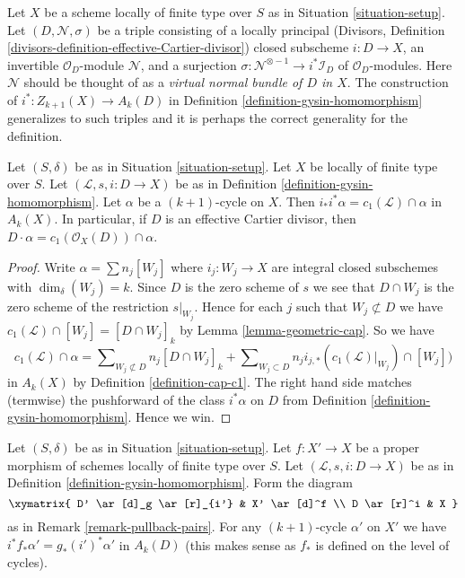 \begin{remark}
\label{remark-generalize}
Let $X$ be a scheme locally of finite type over $S$ as in
Situation \ref{situation-setup}. Let $(D, \mathcal{N}, \sigma)$
be a triple consisting of a locally principal (Divisors, Definition
\ref{divisors-definition-effective-Cartier-divisor}) closed subscheme
$i : D \to X$, an invertible $\mathcal{O}_D$-module $\mathcal{N}$, and
a surjection $\sigma : \mathcal{N}^{\otimes -1} \to i^*\mathcal{I}_D$
of $\mathcal{O}_D$-modules. Here $\mathcal{N}$ should be thought of as
a {\it virtual normal bundle of $D$ in $X$}. The construction of
$i^* : Z_{k + 1}(X) \to A_k(D)$ in
Definition \ref{definition-gysin-homomorphism}
generalizes to such triples and it is perhaps the correct generality
for the definition.
\end{remark}

\begin{lemma}
\label{lemma-support-cap-effective-Cartier}
Let $(S, \delta)$ be as in Situation \ref{situation-setup}. Let $X$ be locally
of finite type over $S$. Let $(\mathcal{L}, s, i : D \to X)$ be as in
Definition \ref{definition-gysin-homomorphism}. Let $\alpha$ be a
$(k + 1)$-cycle on $X$. Then $i_*i^*\alpha = c_1(\mathcal{L}) \cap \alpha$
in $A_k(X)$. In particular, if $D$ is an effective Cartier divisor, then
$D \cdot \alpha = c_1(\mathcal{O}_X(D)) \cap \alpha$.
\end{lemma}

\begin{proof}
Write $\alpha = \sum n_j[W_j]$ where $i_j : W_j \to X$ are integral closed
subschemes with $\dim_\delta(W_j) = k$.
Since $D$ is the zero scheme of $s$ we see that $D \cap W_j$ is the zero scheme
of the restriction $s|_{W_j}$. Hence for each $j$ such that
$W_j \not \subset D$ we have
$c_1(\mathcal{L}) \cap [W_j] = [D \cap W_j]_k$
by Lemma \ref{lemma-geometric-cap}. So we have
$$
c_1(\mathcal{L}) \cap \alpha
=
\sum\nolimits_{W_j \not \subset D} n_j[D \cap W_j]_k
+
\sum\nolimits_{W_j \subset D}
n_j i_{j, *}(c_1(\mathcal{L})|_{W_j}) \cap [W_j])
$$
in $A_k(X)$ by Definition \ref{definition-cap-c1}.
The right hand side matches (termwise) the pushforward of the class
$i^*\alpha$ on $D$ from Definition \ref{definition-gysin-homomorphism}.
Hence we win.
\end{proof}

\begin{lemma}
\label{lemma-closed-in-X-gysin}
Let $(S, \delta)$ be as in Situation \ref{situation-setup}.
Let $f : X' \to X$ be a proper morphism of schemes
locally of finite type over $S$.
Let $(\mathcal{L}, s, i : D \to X)$ be as in
Definition \ref{definition-gysin-homomorphism}.
Form the diagram
$$
\xymatrix{
D' \ar[d]_g \ar[r]_{i'} & X' \ar[d]^f \\
D \ar[r]^i & X
}
$$
as in Remark \ref{remark-pullback-pairs}.
For any $(k + 1)$-cycle $\alpha'$ on $X'$ we have
$i^*f_*\alpha' = g_*(i')^*\alpha'$ in $A_k(D)$
(this makes sense as $f_*$ is defined on the level of cycles).
\end{lemma}

